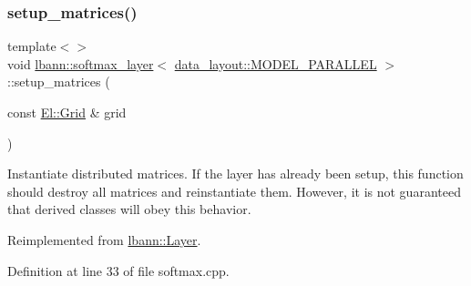 \subsubsection{\texorpdfstring{setup\+\_\+matrices()}{setup\_matrices()}\hspace{0.1cm}{\footnotesize\ttfamily [1/3]}}
{\footnotesize\ttfamily template$<$$>$ \\
void \hyperlink{classlbann_1_1softmax__layer}{lbann\+::softmax\+\_\+layer}$<$ \hyperlink{base_8hpp_a786677cbfb3f5677b4d84f3056eb08dbac94d7b0e44ab8bdcdad694a673cdeae0}{data\+\_\+layout\+::\+M\+O\+D\+E\+L\+\_\+\+P\+A\+R\+A\+L\+L\+EL} $>$\+::setup\+\_\+matrices (\begin{DoxyParamCaption}\item[{const \hyperlink{base_8hpp_a9951bb1719d534e0401b1f06cad19eab}{El\+::\+Grid} \&}]{grid }\end{DoxyParamCaption})\hspace{0.3cm}{\ttfamily [virtual]}}

Instantiate distributed matrices. If the layer has already been setup, this function should destroy all matrices and reinstantiate them. However, it is not guaranteed that derived classes will obey this behavior. 

Reimplemented from \hyperlink{classlbann_1_1Layer_a57bbe21131dc00ab5cf9ea5e3656808e}{lbann\+::\+Layer}.



Definition at line 33 of file softmax.\+cpp.


